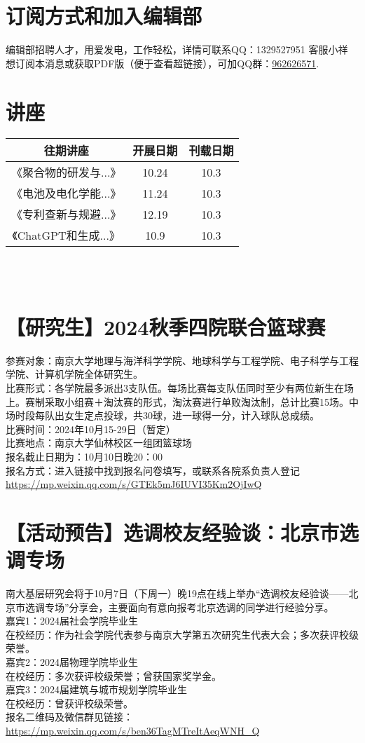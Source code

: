 \documentclass[letterpaper, 12pt]{article}
\begin{document}
\begin{multicols}{2}
\section{订阅方式和加入编辑部}
编辑部招聘人才，用爱发电，工作轻松，详情可联系QQ：1329527951 客服小祥\\想订阅本消息或获取PDF版（便于查看超链接），可加QQ群：\href{https://qm.qq.com/q/FGX1VYCrGS}{962626571}.
\section{讲座}
\begin{tabular}{|c|c|c|}
    \hline
    往期讲座 & 开展日期 & 刊载日期\\
    \hline\hline
    《聚合物的研发与...》 & 10.24 & 10.3\\
    《电池及电化学能...》 & 11.24 & 10.3\\
    《专利查新与规避...》 & 12.19 & 10.3\\
    《ChatGPT和生成...》 & 10.9 & 10.3\\
      \hline
\end{tabular}\\\\

\section{【研究生】2024秋季四院联合篮球赛}
参赛对象：南京大学地理与海洋科学学院、地球科学与工程学院、电子科学与工程学院、计算机学院全体研究生。\\
比赛形式：各学院最多派出3支队伍。每场比赛每支队伍同时至少有两位新生在场上。赛制采取小组赛＋淘汰赛的形式，淘汰赛进行单败淘汰制，总计比赛15场。中场时段每队出女生定点投球，共30球，进一球得一分，计入球队总成绩。\\
比赛时间：2024年10月15-29日（暂定）\\
比赛地点：南京大学仙林校区一组团篮球场\\
报名截止日期为：10月10日晚20：00\\
报名方式：进入链接中找到报名问卷填写，或联系各院系负责人登记\url{https://mp.weixin.qq.com/s/GTEk5mJ6IUVI35Km2OjIwQ}
\section{【活动预告】选调校友经验谈：北京市选调专场}
南大基层研究会将于10月7日（下周一）晚19点在线上举办“选调校友经验谈——北京市选调专场”分享会，主要面向有意向报考北京选调的同学进行经验分享。\\
嘉宾1：2024届社会学院毕业生\\
在校经历：作为社会学院代表参与南京大学第五次研究生代表大会；多次获评校级荣誉。\\
嘉宾2：2024届物理学院毕业生\\
在校经历：多次获评校级荣誉；曾获国家奖学金。\\
嘉宾3：2024届建筑与城市规划学院毕业生\\
在校经历：曾获评校级荣誉。\\
报名二维码及微信群见链接：\url{https://mp.weixin.qq.com/s/ben36TagMTreItAeqWNH_Q}

\end{multicols}
\end{document}
